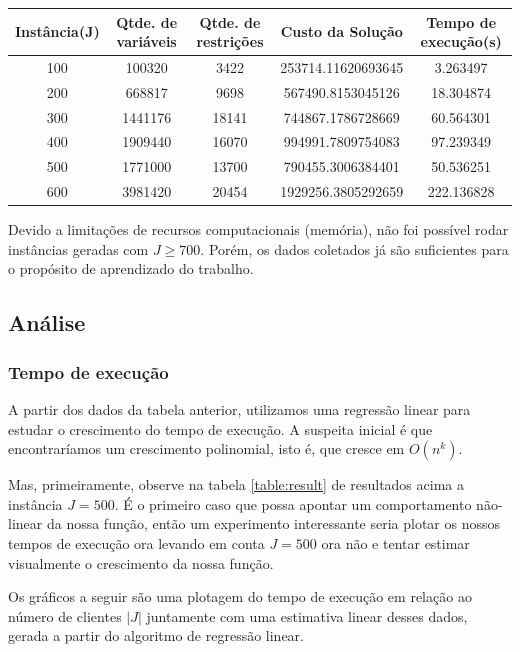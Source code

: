 \documentclass{article}
\begin{document}
\begin{center}
\begin{tabular}{||c c c c c||}
\hline
\label{table:result}
  Instância(J) & Qtde. de variáveis & Qtde. de restrições & Custo da Solução & Tempo de execução(s) \\
 \hline\hline
 100 & 100320 & 3422 & 253714.11620693645 & 3.263497  \\
 \hline
 200 & 668817 & 9698 & 567490.8153045126 & 18.304874\\
 \hline
 300 & 1441176 & 18141 & 744867.1786728669 & 60.564301 \\
 \hline
 400 & 1909440 & 16070 & 994991.7809754083 & 97.239349 \\
 \hline
 500 & 1771000 & 13700 & 790455.3006384401 & 50.536251 \\
 \hline
 600 & 3981420 & 20454 & 1929256.3805292659 & 222.136828 \\
  \hline
\end{tabular}
\end{center}

Devido a limitações de recursos computacionais (memória), não foi possível rodar instâncias geradas com $J \geq 700$. Porém, os dados coletados já são suficientes para o propósito de aprendizado do trabalho.

\subsection{Análise}

\subsubsection{Tempo de execução}

A partir dos dados da tabela anterior, utilizamos uma regressão linear para estudar o crescimento do tempo de execução. A suspeita inicial é que encontraríamos um crescimento polinomial, isto é, que cresce em $O(n^k)$.

Mas, primeiramente, observe na tabela \ref{table:result} de resultados acima a instância $J=500$. É o primeiro caso que possa apontar um comportamento não-linear da nossa função, então um experimento interessante seria plotar os nossos tempos de execução ora levando em conta $J=500$ ora não e tentar estimar visualmente o crescimento da nossa função.

Os gráficos a seguir são uma plotagem do tempo de execução em relação ao número de clientes $|J|$ juntamente com uma estimativa linear desses dados, gerada a partir do algoritmo de regressão linear.
\end{document}

